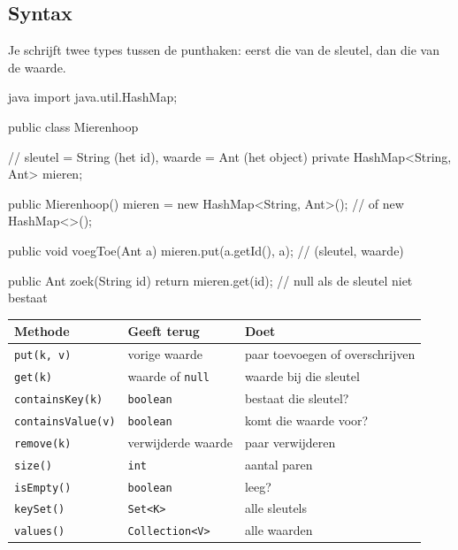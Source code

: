 \documentclass[a4paper,11pt]{article}
\begin{document}
\subsection{Syntax}

Je schrijft twee types tussen de punthaken: eerst die van de sleutel, dan die van
de waarde.

\begin{codeblock}{java}
    import java.util.HashMap;

    public class Mierenhoop
        {
            // sleutel = String (het id), waarde = Ant (het object)
            private HashMap<String, Ant> mieren;

            public Mierenhoop() {
                    mieren = new HashMap<String, Ant>(); // of new HashMap<>();
                }

            public void voegToe(Ant a) {
                    mieren.put(a.getId(), a);   // (sleutel, waarde)
                }

            public Ant zoek(String id) {
                    return mieren.get(id);      // null als de sleutel niet bestaat
                }
        }
\end{codeblock}

\begin{center}
    \begin{tabular}{@{}llp{5.9cm}@{}}
        \toprule
        \textbf{Methode}          & \textbf{Geeft terug}    & \textbf{Doet}                   \\
        \midrule
        \texttt{put(k, v)}        & vorige waarde           & paar toevoegen of overschrijven \\
        \texttt{get(k)}           & waarde of \texttt{null} & waarde bij die sleutel          \\
        \texttt{containsKey(k)}   & \texttt{boolean}        & bestaat die sleutel?            \\
        \texttt{containsValue(v)} & \texttt{boolean}        & komt die waarde voor?           \\
        \texttt{remove(k)}        & verwijderde waarde      & paar verwijderen                \\
        \texttt{size()}           & \texttt{int}            & aantal paren                    \\
        \texttt{isEmpty()}        & \texttt{boolean}        & leeg?                           \\
        \texttt{keySet()}         & \texttt{Set<K>}         & alle sleutels                   \\
        \texttt{values()}         & \texttt{Collection<V>}  & alle waarden                    \\
        \bottomrule
    \end{tabular}
\end{center}
\end{document}
